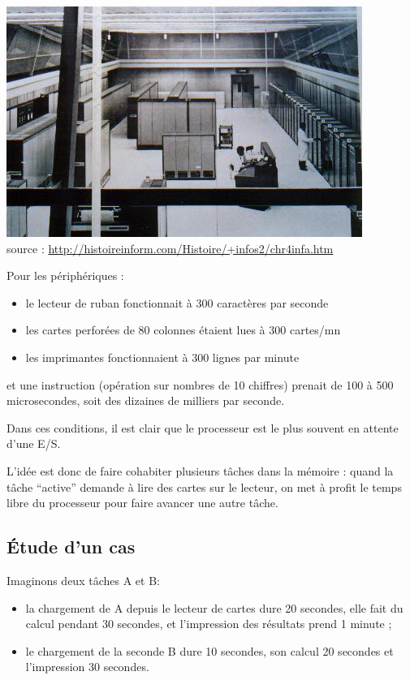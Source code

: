 \begin{multicols}{2}
\begin{center}
\includegraphics[width=\linewidth]{Historique/Gama2_60.jpg} \\
source : \url{http://histoireinform.com/Histoire/+infos2/chr4infa.htm}
\end{center}

Pour les périphériques : 
\begin{itemize}
\item le lecteur de ruban fonctionnait à 300 caractères par seconde
\item les cartes perforées de 80 colonnes étaient lues à 300 cartes/mn
\item les imprimantes fonctionnaient à 300 lignes par minute
\end{itemize}

et une instruction (opération sur nombres de 10 chiffres) prenait de
100 à 500 microsecondes, soit des dizaines de milliers par seconde.


Dans ces conditions, il est clair que le processeur est le plus souvent
en attente d'une E/S.

L'idée est donc de faire cohabiter plusieurs tâches dans
la mémoire : quand la tâche ``active'' demande à lire des cartes sur
le lecteur, on met à profit le temps libre du processeur pour faire
avancer une autre tâche.

\end{multicols}

\subsection{Étude d'un cas}

Imaginons deux tâches A et B: 
\begin{itemize}
\item la chargement de A  depuis le lecteur de cartes dure 20 secondes, elle fait du calcul pendant 30 secondes, et l'impression des
résultats prend 1 minute ;
\item le chargement de la seconde B dure  10 secondes, son calcul 20 secondes et l'impression 30 secondes.
\end{itemize}


